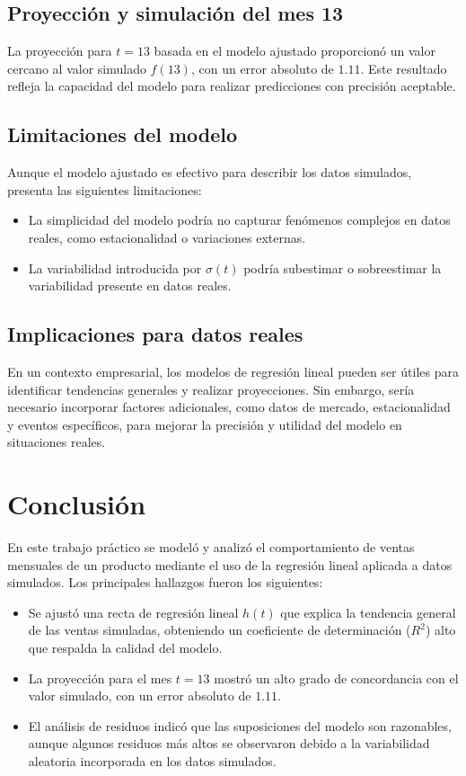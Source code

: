 \documentclass[a4paper,12pt]{article}
\begin{document}
\subsection{Proyección y simulación del mes 13}

La proyección para \( t = 13 \) basada en el modelo ajustado proporcionó un valor cercano al valor simulado \( f(13) \), con un error absoluto de \( 1.11 \). Este resultado refleja la capacidad del modelo para realizar predicciones con precisión aceptable.

\subsection{Limitaciones del modelo}

Aunque el modelo ajustado es efectivo para describir los datos simulados, presenta las siguientes limitaciones:
\begin{itemize}
    \item La simplicidad del modelo podría no capturar fenómenos complejos en datos reales, como estacionalidad o variaciones externas.
    \item La variabilidad introducida por \( \sigma(t) \) podría subestimar o sobreestimar la variabilidad presente en datos reales.
\end{itemize}

\subsection{Implicaciones para datos reales}

En un contexto empresarial, los modelos de regresión lineal pueden ser útiles para identificar tendencias generales y realizar proyecciones. Sin embargo, sería necesario incorporar factores adicionales, como datos de mercado, estacionalidad y eventos específicos, para mejorar la precisión y utilidad del modelo en situaciones reales.
\section{Conclusión}

En este trabajo práctico se modeló y analizó el comportamiento de ventas mensuales de un producto mediante el uso de la regresión lineal aplicada a datos simulados. Los principales hallazgos fueron los siguientes:

\begin{itemize}
    \item Se ajustó una recta de regresión lineal \( h(t) \) que explica la tendencia general de las ventas simuladas, obteniendo un coeficiente de determinación (\( R^2 \)) alto que respalda la calidad del modelo.
    \item La proyección para el mes \( t = 13 \) mostró un alto grado de concordancia con el valor simulado, con un error absoluto de \( 1.11 \).
    \item El análisis de residuos indicó que las suposiciones del modelo son razonables, aunque algunos residuos más altos se observaron debido a la variabilidad aleatoria incorporada en los datos simulados.
\end{itemize}
\end{document}
